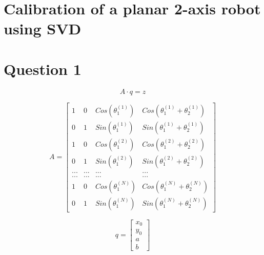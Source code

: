 \section*{Calibration of a planar 2-axis robot using SVD}
\section*{Question 1}

\begin{equation}
A\cdot q=z
\label{eq:} 
\end{equation}



\begin{equation}
A=\begin{bmatrix} 1 & 0 & Cos\left( { \theta  }_{ 1 }^{ \left( 1 \right)  } \right)  & Cos\left( { \theta  }_{ 1 }^{ \left( 1 \right)  }+{ \theta  }_{ 2 }^{ \left( 1 \right)  } \right)  \\ 0 & 1 & Sin\left( { \theta  }_{ 1 }^{ \left( 1 \right)  } \right)  & Sin\left( { \theta  }_{ 1 }^{ \left( 1 \right)  }+{ \theta  }_{ 2 }^{ \left( 1 \right)  } \right)  \\ 1 & 0 & Cos\left( { \theta  }_{ 1 }^{ \left( 2 \right)  } \right)  & Cos\left( { \theta  }_{ 1 }^{ \left( 2 \right)  }+{ \theta  }_{ 2 }^{ \left( 2 \right)  } \right)  \\ 0 & 1 & Sin\left( { \theta  }_{ 1 }^{ \left( 2 \right)  } \right)  & Sin\left( { \theta  }_{ 1 }^{ \left( 2 \right)  }+{ \theta  }_{ 2 }^{ \left( 2 \right)  } \right)  \\ ... & ... & ... & ... \\ ... & ... & ... & ... \\ 1 & 0 & Cos\left( { \theta  }_{ 1 }^{ \left( N \right)  } \right)  & Cos\left( { \theta  }_{ 1 }^{ \left( N \right)  }+{ \theta  }_{ 2 }^{ \left( N \right)  } \right)  \\ 0 & 1 & Sin\left( { \theta  }_{ 1 }^{ \left( N \right)  } \right)  & Sin\left( { \theta  }_{ 1 }^{ \left( N \right)  }+{ \theta  }_{ 2 }^{ \left( N \right)  } \right)  \end{bmatrix}
\label{eq:} 
\end{equation}

\begin{equation}
q=\begin{bmatrix} { x }_{ 0 } \\ { y }_{ 0 } \\ a \\ b \end{bmatrix}
\label{eq:} 
\end{equation}

